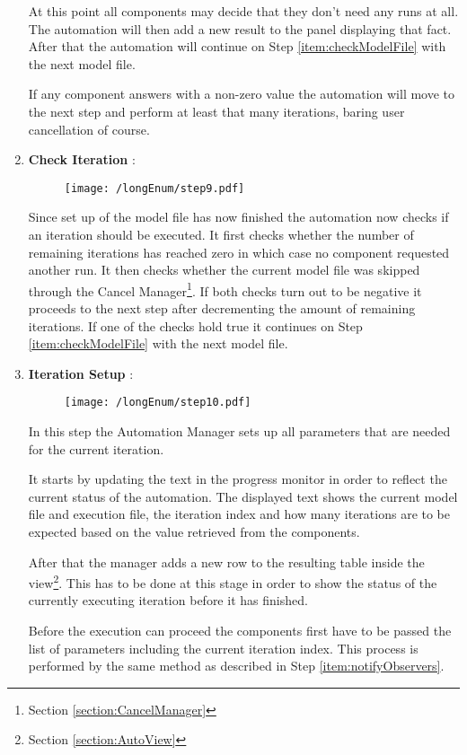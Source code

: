 \begin{enumerate}
At this point all components may decide that they don't need any runs
at all. The automation will then add a new result to the panel displaying that fact. After that
the automation will continue on Step \ref{item:checkModelFile} with the next model file.

If any component answers with a non-zero value the automation will move to the next step and
perform at least that many iterations, baring user cancellation of course.

 \item \label{item:checkIteration} \textbf{Check Iteration} :
\begin{figure}[H]
  \centering
  \texttt{[image: /longEnum/step9.pdf]}
\end{figure}
Since set up of the model file has now finished the 
automation now checks if an iteration should be executed. It first checks whether the
number of remaining iterations has reached zero in which case no component requested
another run. It then checks whether the current model file was skipped through the 
Cancel Manager\footnote{Section \ref{section:CancelManager}}. If both checks turn out to 
be negative it proceeds to the next step after decrementing the amount of remaining
iterations. If one of the checks hold true it continues on Step \ref{item:checkModelFile}
with the next model file.

 \item \label{item:setupIteration} \textbf{Iteration Setup} :
\begin{figure}[H]
  \centering
  \texttt{[image: /longEnum/step10.pdf]}
\end{figure}
In this step the Automation Manager sets up all 
parameters that are needed for the current iteration.

It starts by updating the text in the progress monitor in order to reflect the
current status of the automation. The displayed text shows the current model file
and execution file, the iteration index and how many iterations are to be expected
based on the value retrieved from the components.

After that the manager adds a new row to the resulting table inside the view\footnote{Section
\ref{section:AutoView}}. This has to be done at this stage in order to show the 
status of the currently executing iteration before it has finished.

Before the execution can proceed the components first have to be passed the list
of parameters including the current iteration index. This process is performed by
the same method as described in Step \ref{item:notifyObservers}.


\end{enumerate}
